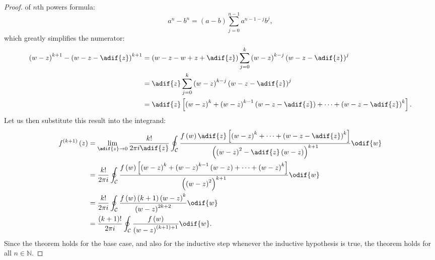 \documentclass{article}
\begin{document}
\begin{proof}
    of \(n\)th powers formula:
    \begin{equation*}
        a^n - b^n = \left( a - b \right) \sum_{j = 0}^{n - 1} a^{n - 1 - j} b^j,
    \end{equation*}
    which greatly simplifies the numerator:
    \begin{align*}
        \left( w - z \right)^{k + 1} - \left( w - z - \adif{z} \right)^{k + 1} & = \left( w - z - w + z + \adif{z} \right) \sum_{j = 0}^k \left( w - z \right)^{k - j} \left( w - z - \adif{z} \right)^j                                       \\
                                                                               & = \adif{z} \sum_{j = 0}^k \left( w - z \right)^{k - j} \left( w - z - \adif{z} \right)^j                                                                      \\
                                                                               & = \adif{z} \left[ \left( w - z \right)^k + \left( w - z \right)^{k - 1} \left( w - z - \adif{z} \right) + \cdots + \left( w - z - \adif{z} \right)^k \right].
    \end{align*}
    Let us then substitute this result into the integrand:
    \begin{align*}
        f^{\left( k + 1 \right)}\left( z \right) & = \lim_{\adif{z} \to 0} \frac{k!}{2 \pi i \adif{z}} \oint_{\mathcal{C}} \frac{f\left( w \right) \adif{z} \left[ \left( w - z \right)^k + \cdots + \left( w - z - \adif{z} \right)^k \right]}{\left( \left( w - z \right)^2 - \adif{z} \left( w - z \right) \right)^{k + 1}} \odif{w} \\
                                                 & = \frac{k!}{2 \pi i} \oint_{\mathcal{C}} \frac{f\left( w \right) \left[ \left( w - z \right)^k + \left( w - z \right)^{k - 1} \left( w - z \right) + \cdots + \left( w - z \right)^k \right]}{\left( \left( w - z \right)^2 \right)^{k + 1}} \odif{w}                                \\
                                                 & = \frac{k!}{2 \pi i} \oint_{\mathcal{C}} \frac{f\left( w \right) \left( k + 1 \right) \left( w - z \right)^k}{\left( w - z \right)^{2k + 2}} \odif{w}                                                                                                                                \\
                                                 & = \frac{\left( k + 1 \right)!}{2 \pi i} \oint_{\mathcal{C}} \frac{f\left( w \right)}{\left( w - z \right)^{\left( k + 1 \right) + 1}} \odif{w}.
    \end{align*}
    Since the theorem holds for the base case, and also for the
    inductive step whenever the inductive hypothesis is true, the
    theorem holds for all \(n \in \mathbb{N}\).
\end{proof}
\end{document}
